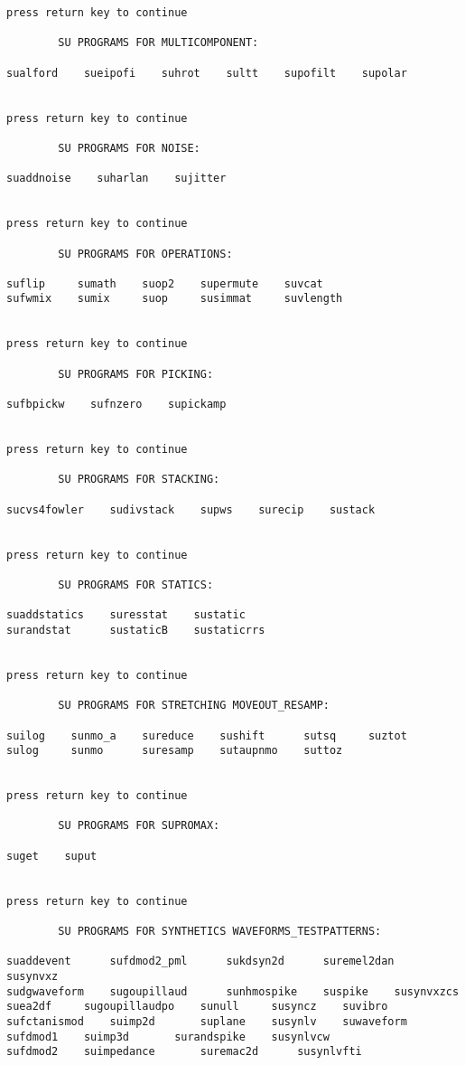 {\begin{verbatim}
press return key to continue
 
        SU PROGRAMS FOR MULTICOMPONENT:
 
sualford    sueipofi  	suhrot    sultt    supofilt    supolar  


press return key to continue
 
        SU PROGRAMS FOR NOISE:
 
suaddnoise    suharlan    sujitter  


press return key to continue
 
        SU PROGRAMS FOR OPERATIONS:
 
suflip     sumath    suop2    supermute    suvcat  
sufwmix    sumix     suop     susimmat     suvlength  


press return key to continue
 
        SU PROGRAMS FOR PICKING:
 
sufbpickw    sufnzero    supickamp  


press return key to continue
 
        SU PROGRAMS FOR STACKING:
 
sucvs4fowler  	sudivstack    supws    surecip    sustack  


press return key to continue
 
        SU PROGRAMS FOR STATICS:
 
suaddstatics  	suresstat    sustatic  
surandstat  	sustaticB    sustaticrrs  


press return key to continue
 
        SU PROGRAMS FOR STRETCHING MOVEOUT_RESAMP:
 
suilog    sunmo_a    sureduce    sushift      sutsq  	suztot  
sulog     sunmo      suresamp    sutaupnmo    suttoz  


press return key to continue
 
        SU PROGRAMS FOR SUPROMAX:
 
suget    suput  


press return key to continue
 
        SU PROGRAMS FOR SYNTHETICS WAVEFORMS_TESTPATTERNS:
 
suaddevent  	sufdmod2_pml  	  sukdsyn2d  	 suremel2dan  	susynvxz  
sudgwaveform  	sugoupillaud  	  sunhmospike    suspike  	susynvxzcs  
suea2df  	sugoupillaudpo    sunull  	 susyncz  	suvibro  
sufctanismod  	suimp2d  	  suplane  	 susynlv  	suwaveform  
sufdmod1  	suimp3d  	  surandspike    susynlvcw  
sufdmod2  	suimpedance  	  suremac2d  	 susynlvfti  



\end{verbatim}}
